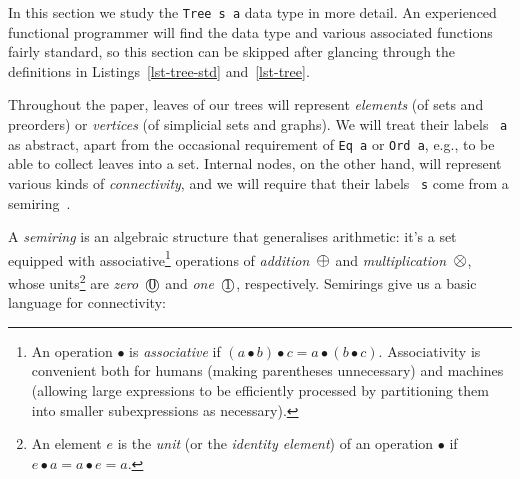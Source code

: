 \documentclass[english,submission]{programming}
\newcommand{\hcode}[1]{{\color{darkblue} \lstinline[keywordstyle={}]|#1|}} %
\newcommand{\add}{\text{\raisebox{-0.1mm}{\large $\oplus$}}}
\newcommand{\mul}{\text{\raisebox{-0.1mm}{\large $\otimes$}}}
\newcommand{\zero}{\raisebox{-0.2mm}{\textcircled{0}}\xspace}
\newcommand{\one}{\raisebox{-0.2mm}{\textcircled{1}}\xspace}
\begin{document}
In this section we study the \hcode{Tree s a} data type in more detail. An
experienced functional programmer will find the data type and various
associated functions fairly standard, so this section can be skipped after
glancing through the definitions in Listings~\ref{lst-tree-std}
and~\ref{lst-tree}.

Throughout the paper, leaves of our trees will represent \emph{elements} (of
sets and preorders) or \emph{vertices} (of simplicial sets and graphs). We will
treat their labels~\hcode{a} as abstract, apart from the occasional requirement
of \hcode{Eq a} or \hcode{Ord a}, e.g., to be able to collect leaves into a set.
Internal nodes, on the other hand, will represent various kinds of
\emph{connectivity}, and we will require that their labels~\hcode{s} come from
a semiring~\cite{1999_semirings_golan}.

A \emph{semiring} is an algebraic structure that generalises arithmetic: it's a
set equipped with associative\footnote{
    An operation $\bullet$ is \emph{associative} if
    $(a \bullet b) \bullet c = a \bullet (b \bullet c)$. Associativity is
    convenient both for humans (making parentheses unnecessary) and machines
    (allowing large expressions to be efficiently processed by partitioning them
    into smaller subexpressions as necessary).
}
operations of \emph{addition}~$\add$ and \emph{multiplication}~$\mul$, whose
units\footnote{
    An element $e$ is the \emph{unit} (or the \emph{identity element}) of an
    operation $\bullet$ if $e \bullet a = a \bullet e = a$.
}
are \emph{zero}~$\text{\zero}$ and \emph{one}~$\text{\one}$, respectively.
Semirings give us a basic language for connectivity:
\end{document}
